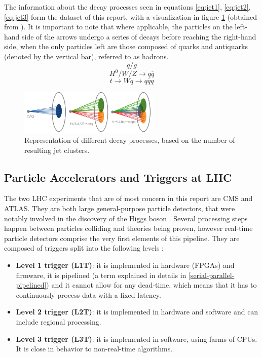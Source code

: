 The information about the decay processes seen in equations \ref{eq:jet1}, \ref{eq:jet2}, \ref{eq:jet3} form the dataset of this report, with a visualization in figure \ref{fig:jedi-jets} (obtained from \cite{9-newman2019jedi-net:}). It is important to note that where applicable, the particles on the left-hand side of the arrows undergo a series of decays before reaching the right-hand side, when the only particles left are those composed of quarks and antiquarks (denoted by the vertical bar), referred to as hadrons.
\begin{equation}\label{eq:jet1}
  q / g
\end{equation}
\begin{equation}\label{eq:jet2}
  H^0 / W / Z \rightarrow q\overline{q}
\end{equation}
\begin{equation}\label{eq:jet3}
  t \rightarrow Wq \rightarrow q\overline{q}q
\end{equation}

\begin{figure}[hpt!]
  \centering
  \includegraphics[trim={0cm 0cm 0cm 0cm}, width=0.6\textwidth, center]{background/jedi_jets.png}
  \caption{Representation of different decay processes, based on the number of resulting jet clusters.}
  \label{fig:jedi-jets}
\end{figure}

\subsection{Particle Accelerators and Triggers at LHC}\label{triggers}
The two LHC experiments that are of most concern in this report are CMS and ATLAS. They are both large general-purpose particle detectors, that were notably involved in the discovery of the Higgs boson \cite{47-greeene2013higgs}. Several processing steps happen between particles colliding and theories being proven, however real-time particle detectors comprise the very first elements of this pipeline. They are composed of triggers split into the following levels \citep[p.16]{48-trigger}:

\begin{itemize}
  \item \textbf{Level 1 trigger (L1T)}: it is implemented in hardware (FPGAs) and firmware, it is pipelined (a term explained in details in \autoref{serial-parallel-pipelined}) and it cannot allow for any dead-time, which means that it has to continuously process data with a fixed latency.
  \item \textbf{Level 2 trigger (L2T)}: it is implemented in hardware and software and can include regional processing.
  \item \textbf{Level 3 trigger (L3T)}: it is implemented in software, using farms of CPUs. It is close in behavior to non-real-time algorithms.
\end{itemize}

